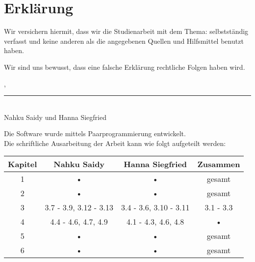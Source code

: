 
\thispagestyle{empty}

\section*{Erkl\"arung}
\vspace*{2em}

Wir versichern hiermit, dass wir die Studienarbeit mit dem Thema: {\itshape \titel} selbstst\"andig verfasst und keine anderen als die angegebenen Quellen und Hilfsmittel benutzt haben.

Wir sind uns bewusst, dass eine falsche Erklärung rechtliche Folgen haben wird.

\vspace{3em}

\abgabeort, \datumAbgabe
\vspace{4em}

\rule{6.8cm}{0.4pt}\\
Nahku Saidy und Hanna Siegfried

\vspace{4em}

Die Software wurde mittels Paarprogrammierung entwickelt.\\
Die schriftliche Ausarbeitung der Arbeit kann wie folgt aufgeteilt werden:

\begin{tabular}{c c c c}
\textbf{Kapitel} & \textbf{Nahku Saidy} & \textbf{Hanna Siegfried} & \textbf{Zusammen} \\ 
\hline 
1 & • & • & gesamt \\ 
2 & • & • & gesamt \\ 
3 & 3.7 - 3.9, 3.12 - 3.13 & 3.4 - 3.6, 3.10 - 3.11 & 3.1 - 3.3 \\ 
4 & 4.4 - 4.6, 4.7, 4.9 & 4.1 - 4.3, 4.6, 4.8 & • \\ 
5 & • & • & gesamt \\ 
6 & • & • & gesamt \\  
\end{tabular} 